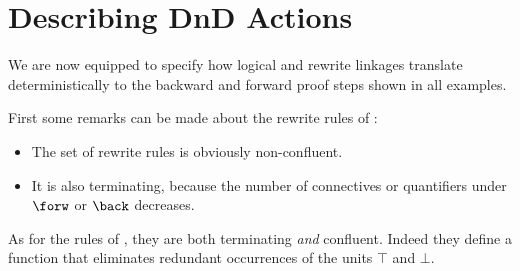 \section{Describing DnD Actions}

We are now equipped to specify how logical and rewrite linkages translate
deterministically to the backward and forward proof steps shown in all examples.

First some remarks can be made about the rewrite rules of :
\begin{itemize}
\item The set of rewrite rules is obviously non-confluent. 
\item It is also terminating, because the number of connectives or quantifiers
  under $\forw$ or $\back$ decreases.
\end{itemize}

As for the rules of , they are both terminating
\emph{and} confluent. Indeed they define a function that eliminates redundant
occurrences of the units $\top$ and $\bot$.


